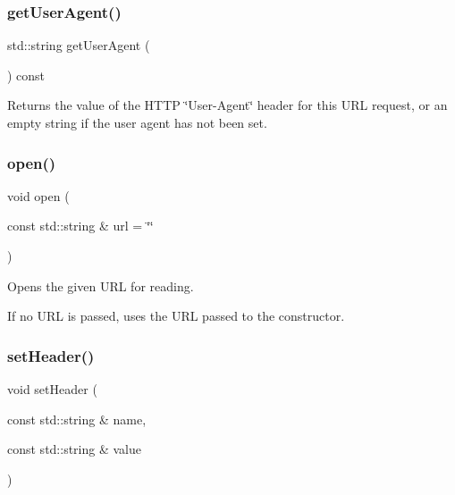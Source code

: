 \mbox{\label{classiurlstream_a479f109234aad1c792be804bf6320c62}} 
\subsubsection{\texorpdfstring{get\+User\+Agent()}{getUserAgent()}}
{\footnotesize\ttfamily std\+::string get\+User\+Agent (\begin{DoxyParamCaption}{ }\end{DoxyParamCaption}) const}



Returns the value of the H\+T\+TP \char`\"{}\+User-\/\+Agent\char`\"{} header for this U\+RL request, or an empty string if the user agent has not been set. 

\mbox{\label{classiurlstream_a9759fd1c1bf1427fa02340c2dabd47d6}} 
\subsubsection{\texorpdfstring{open()}{open()}}
{\footnotesize\ttfamily void open (\begin{DoxyParamCaption}\item[{const std\+::string \&}]{url = {\ttfamily \char`\"{}\char`\"{}} }\end{DoxyParamCaption})}



Opens the given U\+RL for reading. 

If no U\+RL is passed, uses the U\+RL passed to the constructor. \mbox{\label{classiurlstream_af7065da3945b84ffb547b8bad9ddf8dc}} 
\subsubsection{\texorpdfstring{set\+Header()}{setHeader()}}
{\footnotesize\ttfamily void set\+Header (\begin{DoxyParamCaption}\item[{const std\+::string \&}]{name,  }\item[{const std\+::string \&}]{value }\end{DoxyParamCaption})}

